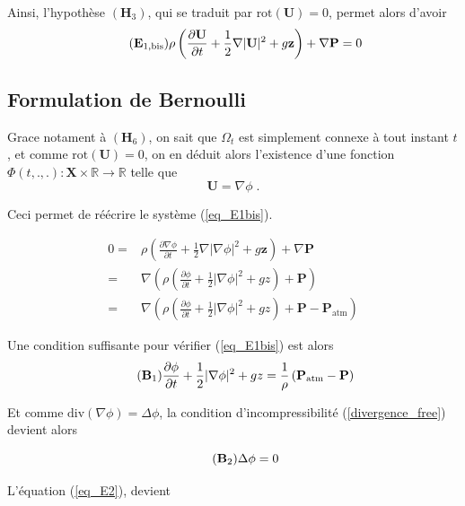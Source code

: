 \documentclass[12pt,a4paper]{article}
\newcommand{\rot}{\text{rot}}
\numberwithin{equation}{section}
\begin{document}
Ainsi, l'hypothèse $(\textbf{H}_3)$, qui se traduit par $\rot(\textbf{U})=0$, permet alors d'avoir 
\begin{equation} \tag{$\textbf{E}_{1,\text{bis}}$} \label{eq_E1bis}
        \rho \left( \frac{\partial \textbf{U}}{\partial t} +\frac{1}{2}\nabla  |\textbf{U}|^2 +  g\textbf{z}\right) + \nabla \textbf{P} = 0 
\end{equation}

\subsection{Formulation de Bernoulli}

Grace notament à $(\textbf{H}_6)$, on sait que $\Omega_t$ est simplement connexe à tout instant $t$, et comme $\rot(\textbf{U}) = 0$, on en déduit alors l'existence d'une fonction $\Phi(t,.,.): \textbf{X}\times \mathbb{R} \rightarrow \mathbb{R}$ telle que $$\textbf{U} = \nabla \phi  \;.$$    

Ceci permet de réécrire le système (\ref{eq_E1bis}).

\begin{align*}
    0 = &\rho \left ( \frac{\partial \nabla \phi }{\partial t} +\frac{1}{2}\nabla  |\nabla \phi|^2  +  g\textbf{z} \right)+ \nabla \textbf{P} 
    \\
    =&\nabla \left ( \rho \left ( \frac{\partial \phi }{\partial t} +\frac{1}{2}|\nabla \phi|^2 +  gz \right) + \textbf{P} \right)
    \\
    =&\nabla \left ( \rho \left ( \frac{\partial \phi }{\partial t} +\frac{1}{2}|\nabla \phi|^2 +  gz \right) + \textbf{P}  - \textbf{P}_{\text{atm}}\right)
\end{align*}

Une condition suffisante pour vérifier (\ref{eq_E1bis}) est alors
\begin{equation} \tag{$\textbf{B}_1$} \label{eq_B1}
  \frac{\partial \phi }{\partial t} +\frac{1}{2}|\nabla \phi|^2 +  gz   = \frac{1}{\rho}\left( \textbf{P}_{\text{atm}}  - \textbf{P}\right)
\end{equation}

Et comme $\text{div}(\nabla \phi) = \Delta \phi$, la condition d'incompressibilité (\ref{divergence_free}) devient alors

\begin{equation} \tag{$\textbf{B}_2$} \label{eq_B2}
    \Delta \phi = 0
\end{equation}

L'équation (\ref{eq_E2}), devient
\end{document}
